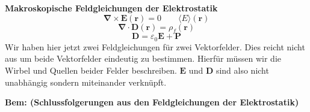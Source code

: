 \documentclass[titlepage,11pt,a4paper,ngerman]{report}
\renewcommand{\vec}[1]{\boldsymbol{#1}}
\newcommand{\lcom}[1]{\color{MidnightBlue}#1\color{black}}
\renewcommand{\epsilon}{\varepsilon}
\newcommand{\vabla}{\boldsymbol{\nabla}}
\newcommand{\bbb}[2]{\begin{tcolorbox}[colback=white,colframe=black,fonttitle=\bfseries,title=#1,sharp corners,tcbox raise base]#2\end{tcolorbox}}
\begin{document}
\bbb{Wiederholung}{
\textbf{Makroskopische Feldgleichungen der Elektrostatik}
\begin{equation*}
\vabla \times \vec{E}(\vec{r}) = 0 \qquad \langle E \rangle (\vec{r})
\end{equation*}
\begin{equation*}
\vabla \cdot \vec{D} (\vec{r}) = \rho_f(\vec{r})
\end{equation*}
\begin{equation*}
\vec{D} = \epsilon_0 \vec{E} + \vec{P}
\end{equation*}
\lcom{Wir haben hier jetzt zwei Feldgleichungen für zwei Vektorfelder. Dies reicht nicht aus um beide Vektorfelder eindeutig zu bestimmen. Hierfür müssen wir die Wirbel und Quellen beider Felder beschreiben. $ \vec{E} $ und $ \vec{D} $ sind also nicht unabhängig sondern miteinander verknüpft.}
}
\noindent
\textbf{Bem: (Schlussfolgerungen aus den Feldgleichungen der Elektrostatik)}
\end{document}

